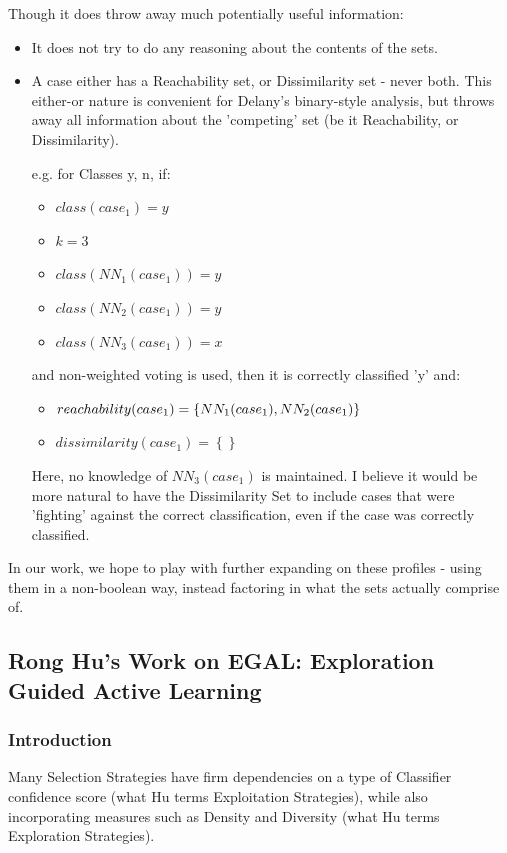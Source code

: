 \documentclass[a4paper,11pt]{report}
\begin{document}
Though it does throw away much potentially useful information:

\begin{itemize}
	\item It does not try to do any reasoning about the contents of the sets.
	\item A case either has a Reachability set, or Dissimilarity set - never both. This either-or nature is convenient for Delany's binary-style analysis, but throws away all information about the 'competing' set (be it Reachability, or Dissimilarity).
	
	e.g. for Classes {y, n}, if:
	\begin{itemize}
		\item $class(case_{1})=y$ 
		\item $k = 3$
		\item $class(NN_{1}(case_{1})) = y$ 
		\item $class(NN_{2}(case_{1})) = y$
		\item $class(NN_{3}(case_{1})) = x$  
	\end{itemize}
	and non-weighted voting is used, then it is correctly classified 'y' and:
	\begin{itemize}
		\item $reachability(case_{1})=\left\{ NN_{1}(case_{1}),\hphantom{}NN_{2}(case_{1})\right\} $
		\item $dissimilarity(case_{1})=\left\{ \right\} $
	\end{itemize}
	
	Here, no knowledge of $NN_{3}(case_{1})$ is maintained. I believe it would be more natural to have the Dissimilarity Set to include cases that were 'fighting' against the correct classification, even if the case was correctly classified.
\end{itemize} 

In our work, we hope to play with further expanding on these profiles - using them in a non-boolean way, instead factoring in what the sets actually comprise of. 


\subsection{Rong Hu's Work on EGAL: Exploration Guided Active Learning}
\subsubsection{Introduction}
Many Selection Strategies have firm dependencies on a type of Classifier confidence score (what Hu terms Exploitation Strategies), while also incorporating measures such as Density and Diversity (what Hu terms Exploration Strategies).
\end{document}
